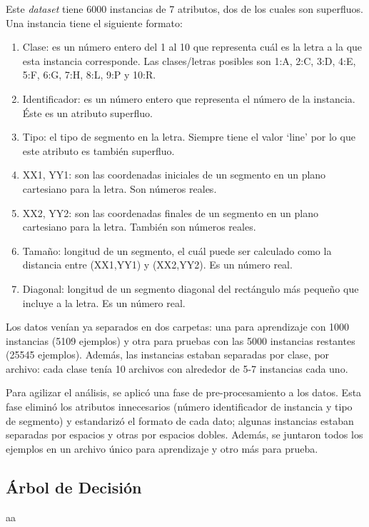 \documentclass{llncs}
\begin{document}
Este \textit{dataset} tiene 6000 instancias de 7 atributos, dos de los cuales son superfluos. Una instancia tiene el siguiente formato:

\begin{enumerate}
	\item Clase: es un número entero del 1 al 10 que representa cuál es la letra a la que esta instancia corresponde. Las clases/letras posibles son 1:A, 2:C, 3:D, 4:E, 5:F, 6:G, 7:H, 8:L, 9:P y 10:R.
	\item Identificador: es un número entero que representa el número de la instancia. Éste es un atributo superfluo.
	\item Tipo: el tipo de segmento en la letra. Siempre tiene el valor `line' por lo que este atributo es también superfluo.
	\item XX1, YY1: son las coordenadas iniciales de un segmento en un plano cartesiano para la letra. Son números reales.
	\item XX2, YY2: son las coordenadas finales de un segmento en un plano cartesiano para la letra. También son números reales.
	\item Tamaño: longitud de un segmento, el cuál puede ser calculado como la distancia entre (XX1,YY1) y (XX2,YY2). Es un número real.
	\item Diagonal: longitud de un segmento diagonal del rectángulo más pequeño que incluye a la letra. Es un número real.
\end{enumerate}

Los datos venían ya separados en dos carpetas: una para aprendizaje con 1000 instancias (5109 ejemplos) y otra para pruebas con las 5000 instancias restantes (25545 ejemplos).
Además, las instancias estaban separadas por clase, por archivo: cada clase tenía 10 archivos con alrededor de 5-7 instancias cada uno.

Para agilizar el análisis, se aplicó una fase de pre-procesamiento a los datos.
Esta fase eliminó los atributos innecesarios (número identificador de instancia y tipo de segmento) y estandarizó el formato de cada dato; algunas instancias estaban separadas por espacios y otras por espacios dobles.
Además, se juntaron todos los ejemplos en un archivo único para aprendizaje y otro más para prueba.

\subsection{Árbol de Decisión}
\label{subsec:tree}

aa
\end{document}

